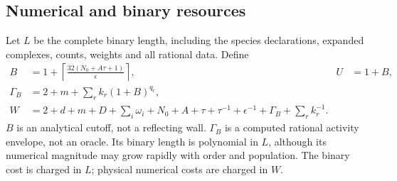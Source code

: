 \documentclass[11pt,reqno]{amsart}
\theoremstyle{definition}
\theoremstyle{remark}
\begin{document}
\subsection{Numerical and binary resources}
Let $L$ be the complete binary length, including the species declarations,
expanded complexes, counts, weights and all rational data. Define
\begin{align}
 B&=1+\left\lceil\frac{32(N_0+A\tau+1)}{\epsilon}\right\rceil,
 & U&=1+B,\label{eq:cutoff}\\
 \Gamma_B&=2+m+\sum_r k_r(1+B)^{q_r},\label{eq:gamma}\\
 W&=2+d+m+D+\sum_i\omega_i+N_0+A+\tau+\tau^{-1}
       +\epsilon^{-1}+\Gamma_B+\sum_r k_r^{-1}.\label{eq:W}
\end{align}
$B$ is an analytical cutoff, not a reflecting wall. $\Gamma_B$ is a computed
rational activity envelope, not an oracle. Its binary length is polynomial in
$L$, although its numerical magnitude may grow rapidly with order and
population. The binary cost is charged in $L$; physical numerical costs are
charged in $W$.
\end{document}
